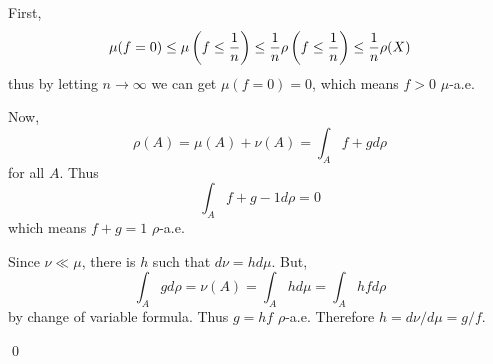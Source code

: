 \begin{problem}[13.6]\hfill

	First,
	\[
		\mu(f = 0) \leq \mu\left( f \leq \frac{1}{n} \right) \leq \frac{1}{n} \rho\left( f \leq {1 \over n} \right) \leq {1 \over n} \rho(X)
	\]
	thus by letting $n\rightarrow \infty$ we can get $\mu(f= 0) = 0$, which means $f>0$ $\mu$-a.e.

	Now,
	\[
		\rho(A) = \mu(A) + \nu(A) = \int_A f+g d\rho
	\]
	for all $A$.
	Thus
	\[
		\int_A f+g-1 d\rho = 0
	\]
	which means $f+g = 1$ $\rho$-a.e.

	Since $\nu \ll \mu$, there is $h$ such that $d\nu = hd\mu$.
	But,
	\[
		\int_A g d\rho = \nu(A) = \int_A hd\mu = \int_A hf d\rho
	\]
	by change of variable formula.
	Thus $g = hf$ $\rho$-a.e.
	Therefore $h = d\nu /d\mu = g/f$.

	\qed

\end{problem}
